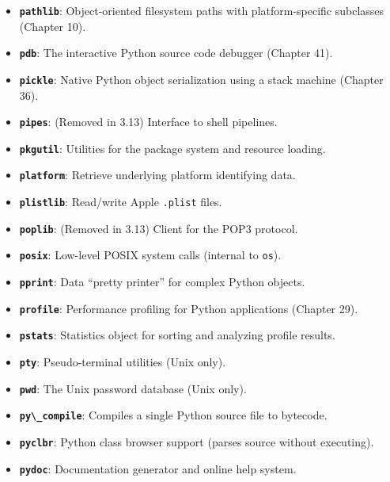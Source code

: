 \begin{itemize}
\tightlist
\item
  \textbf{\passthrough{\lstinline!pathlib!}}: Object-oriented filesystem
  paths with platform-specific subclasses (Chapter 10).
\item
  \textbf{\passthrough{\lstinline!pdb!}}: The interactive Python source
  code debugger (Chapter 41).
\item
  \textbf{\passthrough{\lstinline!pickle!}}: Native Python object
  serialization using a stack machine (Chapter 36).
\item
  \textbf{\passthrough{\lstinline!pipes!}}: (Removed in 3.13) Interface
  to shell pipelines.
\item
  \textbf{\passthrough{\lstinline!pkgutil!}}: Utilities for the package
  system and resource loading.
\item
  \textbf{\passthrough{\lstinline!platform!}}: Retrieve underlying
  platform identifying data.
\item
  \textbf{\passthrough{\lstinline!plistlib!}}: Read/write Apple
  \passthrough{\lstinline!.plist!} files.
\item
  \textbf{\passthrough{\lstinline!poplib!}}: (Removed in 3.13) Client
  for the POP3 protocol.
\item
  \textbf{\passthrough{\lstinline!posix!}}: Low-level POSIX system calls
  (internal to \passthrough{\lstinline!os!}).
\item
  \textbf{\passthrough{\lstinline!pprint!}}: Data ``pretty printer'' for
  complex Python objects.
\item
  \textbf{\passthrough{\lstinline!profile!}}: Performance profiling for
  Python applications (Chapter 29).
\item
  \textbf{\passthrough{\lstinline!pstats!}}: Statistics object for
  sorting and analyzing profile results.
\item
  \textbf{\passthrough{\lstinline!pty!}}: Pseudo-terminal utilities
  (Unix only).
\item
  \textbf{\passthrough{\lstinline!pwd!}}: The Unix password database
  (Unix only).
\item
  \textbf{\passthrough{\lstinline!py\_compile!}}: Compiles a single
  Python source file to bytecode.
\item
  \textbf{\passthrough{\lstinline!pyclbr!}}: Python class browser
  support (parses source without executing).
\item
  \textbf{\passthrough{\lstinline!pydoc!}}: Documentation generator and
  online help system.

\end{itemize}
